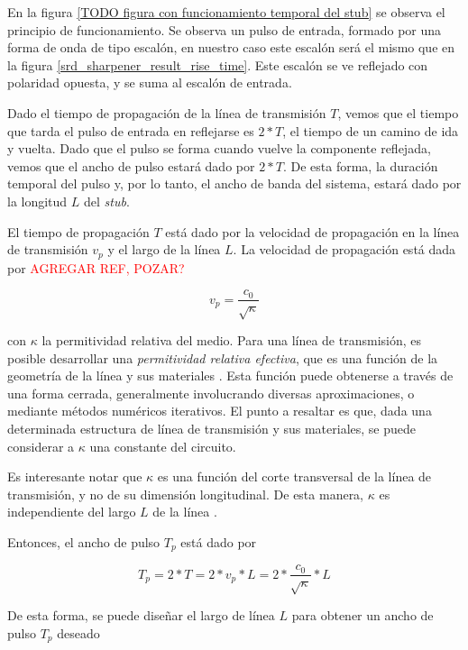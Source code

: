 En la figura \ref{TODO figura con funcionamiento temporal del stub} se observa
el principio de funcionamiento. Se observa un pulso de entrada, formado por una
forma de onda de tipo escalón, en nuestro caso este escalón será el mismo que en
la figura \ref{srd_sharpener_result_rise_time}. Este escalón se ve reflejado con
polaridad opuesta, y se suma al escalón de entrada.

Dado el tiempo de propagación de la línea de transmisión $T$, vemos que el
tiempo que tarda el pulso de entrada en reflejarse es $2*T$, el tiempo de un
camino de ida y vuelta. Dado que el pulso se forma cuando vuelve la componente
reflejada, vemos que el ancho de pulso estará dado por $2*T$. De esta forma, la
duración temporal del pulso y, por lo tanto, el ancho de banda del sistema,
estará dado por la longitud $L$ del \textit{stub}.

El tiempo de propagación $T$ está dado por la velocidad de propagación en la
línea de transmisión $v_p$ y el largo de la línea $L$. La velocidad de
propagación está dada por \textcolor{red}{AGREGAR REF, POZAR?} \cite{pozar2011}

\begin{equation}
  v_p = \frac{c_0}{\sqrt{\kappa}}
\end{equation}

con $\kappa$  la permitividad relativa del medio. Para una línea de transmisión,
es posible desarrollar una \textit{permitividad relativa efectiva}, que es una
función de la geometría de la línea y sus materiales \cite{pozar2011}. Esta
función puede obtenerse a través de una forma cerrada, generalmente involucrando
diversas aproximaciones, o mediante métodos numéricos iterativos. El punto a
resaltar es que, dada una determinada estructura de línea de transmisión y sus
materiales, se puede considerar a $\kappa$ una constante del circuito.

Es interesante notar que $\kappa$ es una función del corte transversal de la
línea de transmisión, y no de su dimensión longitudinal. De esta manera,
$\kappa$ es independiente del largo $L$ de la línea \cite{pozar2011}.

Entonces, el ancho de pulso $T_p$ está dado por

\begin{equation}
  T_p = 2*T = 2*v_p*L =2*\frac{c_0}{\sqrt{\kappa}}*L
\end{equation}

De esta forma, se puede diseñar el largo de línea $L$ para obtener un ancho de
pulso $T_p$ deseado

